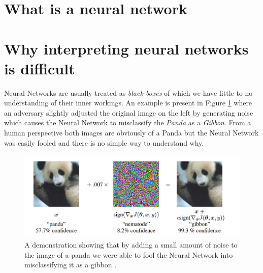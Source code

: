 \section{What is a neural network}
\section{Why interpreting neural networks is difficult}
Neural Networks are usually treated as \emph{black boxes} of which we have little to no understanding of their inner workings. An example is present in Figure \ref{fig:panada-nn} where an adversary \cite{szegedy2014intriguing} slightly adjusted the original image on the left by generating noise which causes the Neural Network to misclassify the \emph{Panda} as a \emph{Gibbon}. From a human perspective both images are obviously of a Panda but the Neural Network was easily fooled and there is no simple way to understand why. 
\begin  {figure}[!htpb]
  \includegraphics[width=\linewidth]{Introduction_Images/nn-unexplainable.png}
   \caption{A demonstration showing that by adding a small amount of noise to the image of a panda we were able to fool the Neural Network into misclassifying it as a gibbon \cite{goodfellow2015explaining}.}
    \label{fig:panada-nn}
\end{figure}
